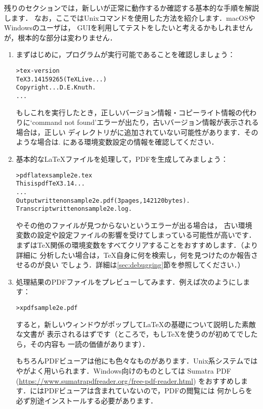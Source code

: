 \documentclass[uplatex,dvipdfmx,tombow]{jsarticle}
\begin{document}
残りのセクションでは，新しい\TL が正常に動作するか確認する基本的な手順を解説します．
なお，ここではUnixコマンドを使用した方法を紹介します．macOSやWindowsのユーザは，
GUIを利用してテストをしたいと考えるかもしれませんが，根本的な部分は変わりません．

\begin{enumerate}
\item まずはじめに，プログラムが実行可能であることを確認しましょう：
%
\begin{alltt}
> tex -version
TeX 3.14159265 (TeX Live ...)
Copyright ... D.E. Knuth.
...
\end{alltt}
%
もしこれを実行したとき，正しいバージョン情報・コピーライト情報の代わりに`command
not found'エラーが出たり，古いバージョン情報が表示される場合は，正しい%
ディレクトリがに追加されていない可能性があります．そのような場合は\p.%
\pageref{sec:env}にある環境変数設定の情報を確認してください．

\item 基本的な\LaTeX ファイルを処理して，PDFを生成してみましょう：
%
\begin{alltt}
> pdflatex sample2e.tex
This is pdfTeX 3.14...
...
Output written on sample2e.pdf (3 pages, 142120 bytes).
Transcript written on sample2e.log.
\end{alltt}
%
やその他のファイルが見つからないというエラーが出る場合は，
古い環境変数の設定や設定ファイルの影響を受けてしまっている可能性が高いです．
まずは\TeX 関係の環境変数をすべてクリアすることをおすすめします．（より詳細に
分析したい場合は，\TeX 自身に何を検索し，何を見つけたのか報告させるのが良い
でしょう．詳細は\ref{sec:debugging}節を参照してください．）

\item 処理結果のPDFファイルをプレビューしてみます．例えば次のようにします：
%
\begin{alltt}
> xpdf sample2e.pdf
\end{alltt}
%
すると，新しいウィンドウがポップして\LaTeX の基礎について説明した素敵な文書が
表示されるはずです（ところで，もし\TeX を使うのが初めてでしたら，その内容も
一読の価値があります）．

もちろんPDFビューアは他にも色々なものがあります．Unix系システムでは
やがよく用いられます．Windows向けのものとしては
Sumatra PDF (\url{https://www.sumatrapdfreader.org/free-pdf-reader.html})
をおすすめします．\TL にはPDFビューアは含まれていないので，PDFの閲覧には
何かしらを必ず別途インストールする必要があります．


\end{enumerate}
\end{document}
